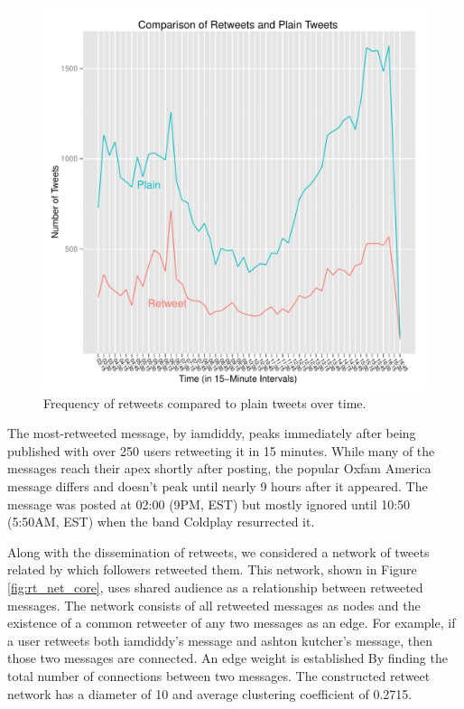 \documentclass[a4paper, 11pt, titlepage]{article}
\begin{document}
\begin{figure}[h]
\centering
\includegraphics[width=120mm]{../figures/rt_compare_over_time}
\caption{Frequency of retweets compared to plain tweets over time.}
\label{fig:rt_compare_over_time}
\end{figure}

The most-retweeted message, by iamdiddy, peaks immediately after being published with over 250 users retweeting it in 15 minutes.  While many of the messages reach their apex shortly after posting, the popular Oxfam America message differs and doesn't peak until nearly 9 hours after it appeared.  The message was posted at 02:00 (9PM, EST) but mostly ignored until 10:50 (5:50AM, EST) when the band Coldplay resurrected it.

Along with the dissemination of retweets, we considered a network of tweets related by which followers retweeted them.  This network, shown in Figure \ref{fig:rt_net_core}, uses shared audience as a relationship between retweeted messages.  The network consists of all retweeted messages as nodes and the existence of a common retweeter of any two messages as an edge.  For example, if a user retweets both iamdiddy's message and ashton kutcher's message, then those two messages are connected.  An edge weight is established By finding the total number of connections between two messages.  The constructed retweet network has a diameter of 10 and average clustering coefficient of 0.2715.
\end{document}
